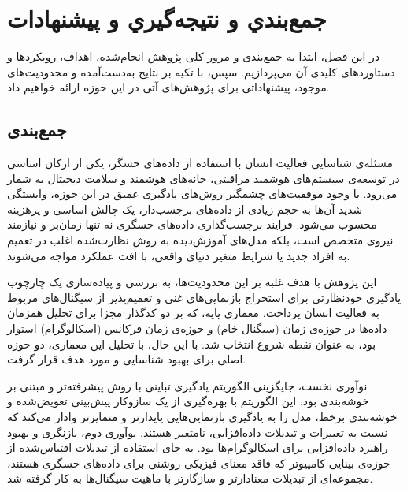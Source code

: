 \chapter{جمع‌بندي و نتيجه‌گيري و پیشنهادات}
\clearpage
در این فصل، ابتدا به جمع‌بندی و مرور کلی پژوهش انجام‌شده، اهداف، رویکردها و دستاوردهای کلیدی آن می‌پردازیم. سپس، با تکیه بر نتایج به‌دست‌آمده و محدودیت‌های موجود، پیشنهاداتی برای پژوهش‌های آتی در این حوزه ارائه خواهیم داد.

\section{جمع‌بندی}

مسئله‌ی شناسایی فعالیت انسان با استفاده از داده‌های حسگر، یکی از ارکان اساسی در توسعه‌ی سیستم‌های هوشمند مراقبتی، خانه‌های هوشمند و سلامت دیجیتال به شمار می‌رود. با وجود موفقیت‌های چشمگیر روش‌های یادگیری عمیق در این حوزه، وابستگی شدید آن‌ها به حجم زیادی از داده‌های برچسب‌دار، یک چالش اساسی و پرهزینه محسوب می‌شود. فرایند برچسب‌گذاری داده‌های حسگری نه تنها زمان‌بر و نیازمند نیروی متخصص است، بلکه مدل‌های آموزش‌دیده به روش نظارت‌شده اغلب در تعمیم به افراد جدید یا شرایط متغیر دنیای واقعی، با افت عملکرد مواجه می‌شوند.

این پژوهش با هدف غلبه بر این محدودیت‌ها، به بررسی و پیاده‌سازی یک چارچوب یادگیری خودنظارتی برای استخراج بازنمایی‌های غنی و تعمیم‌پذیر از سیگنال‌های مربوط به فعالیت انسان پرداخت. معماری پایه، که بر دو کدگذار مجزا برای تحلیل همزمان داده‌ها در حوزه‌ی زمان (سیگنال خام) و حوزه‌ی زمان-فرکانس (اسکالوگرام) استوار بود، به عنوان نقطه شروع انتخاب شد. با این حال، با تحلیل این معماری، دو حوزه اصلی برای بهبود شناسایی و مورد هدف قرار گرفت.

نوآوری نخست، جایگزینی الگوریتم یادگیری تباینی  با روش پیشرفته‌تر و مبتنی بر خوشه‌بندی  بود. این الگوریتم با بهره‌گیری از یک سازوکار پیش‌بینی تعویض‌شده و خوشه‌بندی برخط، مدل را به یادگیری بازنمایی‌هایی پایدارتر و متمایزتر وادار می‌کند که نسبت به تغییرات و تبدیلات داده‌افزایی، نامتغیر هستند. نوآوری دوم، بازنگری و بهبود راهبرد داده‌افزایی برای اسکالوگرام‌ها بود. به جای استفاده از تبدیلات اقتباس‌شده از حوزه‌ی بینایی کامپیوتر که فاقد معنای فیزیکی روشنی برای داده‌های حسگری هستند، مجموعه‌ای از تبدیلات معنادارتر و سازگارتر با ماهیت سیگنال‌ها به کار گرفته شد.

